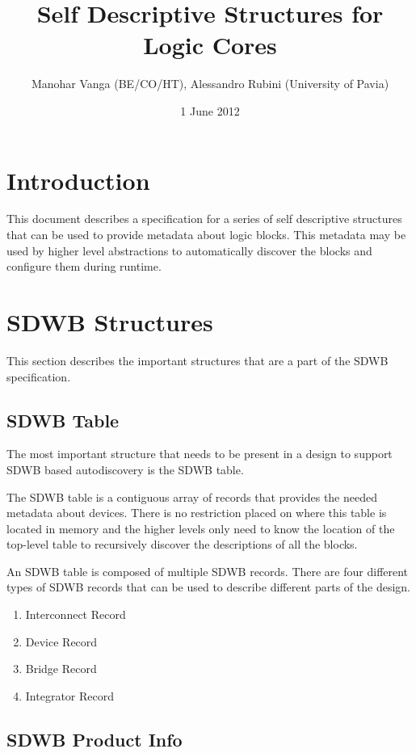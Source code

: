 \documentclass[a4paper, 12pt]{article}
\title{Self Descriptive Structures for Logic Cores}
\author{Manohar Vanga (BE/CO/HT), Alessandro Rubini (University of Pavia)}
\date{1 June 2012}
\begin{document}
\maketitle

\tableofcontents
\listoftables
\listoffigures

\pagebreak

\section{Introduction}

This document describes a specification for a series of self descriptive
structures that can be used to provide metadata about logic blocks. This metadata
may be used by higher level abstractions to automatically discover the blocks and
configure them during runtime.

\section{SDWB Structures}

This section describes the important structures that are a part of the SDWB specification.

\subsection{SDWB Table}

The most important structure that needs to be present in a design to support SDWB
based autodiscovery is the SDWB table.

The SDWB table is a contiguous array of records that provides the needed metadata
about devices. There is no restriction placed on where this table is located in
memory and the higher levels only need to know the location of the top-level table
to recursively discover the descriptions of all the blocks.

An SDWB table is composed of multiple SDWB records. There are four different types of
SDWB records that can be used to describe different parts of the design.

\begin{enumerate}
\item Interconnect Record
\item Device Record
\item Bridge Record
\item Integrator Record
\end{enumerate}

\subsection{SDWB Product Info}
\end{document}
